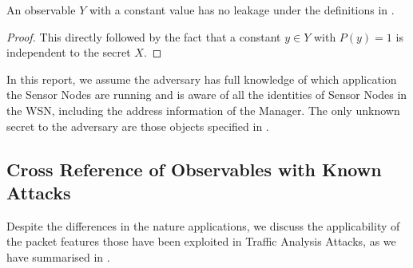 \begin{corollary} \label{Cor: Constant Leakage}
	An observable $Y$ with a constant value has no leakage under the definitions in .
\end{corollary}

\begin{proof}
	This directly followed by the fact that a constant $y \in Y$ with $P(y) = 1$ is independent to the secret $X$.
\end{proof}

In this report, we assume the adversary has full knowledge of which application the Sensor Nodes are running and is aware of all the identities of Sensor Nodes in the WSN, including the address information of the Manager. The only unknown secret to the adversary are those objects specified in . 

\subsection{Cross Reference of Observables with Known Attacks} \label{Subsec: Cross Reference}

Despite the differences in the nature applications, we discuss the applicability of the packet features those have been exploited in Traffic Analysis Attacks, as we have summarised in .

